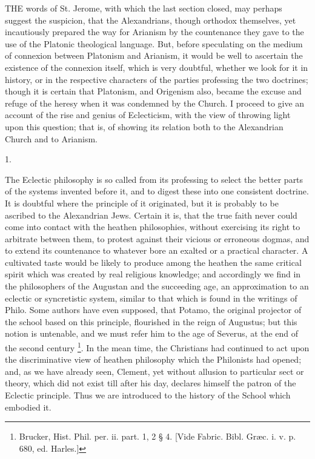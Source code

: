 THE words of St. Jerome, with which the
last section closed, may perhaps suggest the suspicion, that the
Alexandrians, though orthodox themselves, yet incautiously prepared
the way for Arianism by the countenance they gave to the use of the
Platonic theological language. But, before speculating on the medium
of connexion between Platonism and Arianism, it would be well to
ascertain the existence of the connexion itself, which is very
doubtful, whether we look for it in history, or in the respective
characters of the parties professing the two doctrines; though it is
certain that Platonism, and Origenism also, became the excuse and
refuge of the heresy when it was condemned by the Church. I proceed to
give an account of the rise and genius of Eclecticism, with the view
of throwing light upon this question; that is, of showing its relation
both to the Alexandrian Church and to Arianism.

1.

The Eclectic philosophy is so called from its professing to select
the better parts of the systems invented before it, and to
digest these into one consistent doctrine. It is doubtful where the
principle of it originated, but it is probably to be ascribed to the
Alexandrian Jews. Certain it is, that the true faith never could come
into contact with the heathen philosophies, without exercising its
right to arbitrate between them, to protest against their vicious or
erroneous dogmas, and to extend its countenance to whatever bore an
exalted or a practical character. A cultivated taste would be likely
to produce among the heathen the same critical spirit which was
created by real religious knowledge; and accordingly we find in the
philosophers of the Augustan and the succeeding age, an approximation
to an eclectic or syncretistic system, similar to that which is found
in the writings of Philo. Some authors have even supposed, that Potamo,
the original projector of the school based on this principle,
flourished in the reign of Augustus; but this notion is untenable, and
we must refer him to the age of Severus, at the end of the second
century \footnote{Brucker, Hist. Phil. per. ii. part. 1, 2 § 4. [Vide Fabric.
Bibl. Græc. i. v. p. 680, ed. Harles.]}. In the mean
time, the Christians had continued to act upon the discriminative view
of heathen philosophy which the Philonists had opened; and, as we have
already seen, Clement, yet without allusion to particular sect or
theory, which did not exist till after his day, declares himself the
patron of the Eclectic principle. Thus we are introduced to the
history of the School which embodied it.

